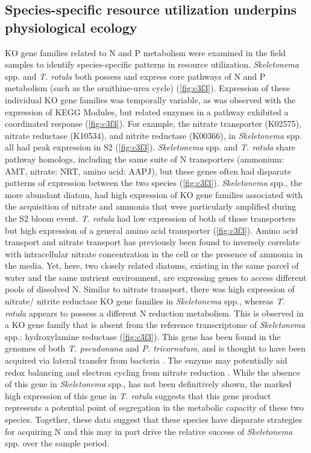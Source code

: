 \subsection{Species-specific resource utilization underpins physiological ecology}
KO gene families related to N and P metabolism were examined in the field samples to identify species-specific patterns in resource utilization. \textit{Skeletonema} spp. and \textit{T. rotula} both possess and express core pathways of N and P metabolism (such as the ornithine-urea cycle) (\cref{fig:c3f3}). Expression of these individual KO gene families was temporally variable, as was observed with the expression of KEGG Modules, but related enzymes in a pathway exhibited a coordinated response (\cref{fig:c3f3}). For example, the nitrate transporter (K02575), nitrate reductase (K10534), and nitrite reductase (K00366), in \textit{Skeletonema} spp. all had peak expression in S2 (\cref{fig:c3f3}). \textit{Skeletonema} spp. and \textit{T. rotula} share pathway homologs, including the same suite of N transporters (ammonium: AMT, nitrate: NRT, amino acid: AAPJ), but these genes often had disparate patterns of expression between the two species (\cref{fig:c3f3}). \textit{Skeletonema} spp., the more abundant diatom, had high expression of KO gene families associated with the acquisition of nitrate and ammonia that were particularly amplified during the S2 bloom event. \textit{T. rotula} had low expression of both of those transporters but high expression of a general amino acid transporter (\cref{fig:c3f3}). Amino acid transport \citep{North1972} and nitrate transport \citep{Serra1978} has previously been found to inversely correlate with intracellular nitrate concentration in the cell or the presence of ammonia in the media. Yet, here, two closely related diatoms, existing in the same parcel of water and the same nutrient environment, are expressing genes to access different pools of dissolved N. Similar to nitrate transport, there was high expression of nitrate/ nitrite reductase KO gene families in \textit{Skeletonema} spp., whereas \textit{T. rotula} appears to possess a different N reduction metabolism. This is observed in a KO gene family that is absent from the reference transcriptome of \textit{Skeletonema} spp.: hydroxylamine reductase (\cref{fig:c3f3}). This gene has been found in the genomes of both \textit{T. pseudonana} and \textit{P. tricornutum}, and is thought to have been acquired via lateral transfer from bacteria \citep{Bowler2008}. The enzyme may potentially aid redox balancing and electron cycling from nitrate reduction \citep{Allen2008}. While the absence of this gene in \textit{Skeletonema} spp., has not been definitively shown, the marked high expression of this gene in \textit{T. rotula} suggests that this gene product represents a potential point of segregation in the metabolic capacity of these two species. Together, these data suggest that these species have disparate strategies for acquiring N and this may in part drive the relative success of \textit{Skeletonema} spp. over the sample period.\par

